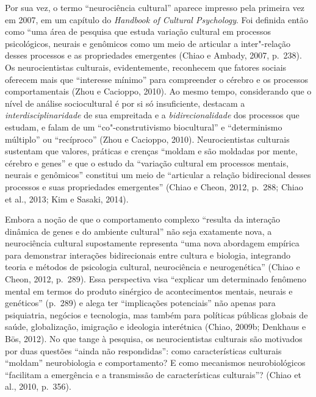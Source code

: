 Por sua vez, o termo ``neurociência cultural'' aparece impresso pela
primeira vez em 2007, em um capítulo do \emph{Handbook of Cultural
Psychology}. Foi definida então como ``uma área de pesquisa que estuda
variação cultural em processos psicológicos, neurais e genômicos como um
meio de articular a inter"-relação desses processos e as propriedades
emergentes (Chiao e Ambady, 2007, p.~238). Os neurocientistas culturais,
evidentemente, reconhecem que fatores sociais oferecem mais que
``interesse mínimo'' para compreender o cérebro e os processos
comportamentais (Zhou e Cacioppo, 2010). Ao mesmo tempo, considerando
que o nível de análise sociocultural é por si só insuficiente, destacam
a \emph{interdisciplinaridade} de sua empreitada e a
\emph{bidirecionalidade} dos processos que estudam, e falam de um
``co"-construtivismo biocultural'' e ``determinismo múltiplo'' ou
``recíproco'' (Zhou e Cacioppo, 2010). Neurocientistas culturais
sustentam que valores, práticas e crenças ``moldam e são moldadas por
mente, cérebro e genes'' e que o estudo da ``variação cultural em
processos mentais, neurais e genômicos'' constitui um meio de
``articular a relação bidirecional desses processos e suas propriedades
emergentes'' (Chiao e Cheon, 2012, p.~288; Chiao et al., 2013; Kim e
Sasaki, 2014).

Embora a noção de que o comportamento complexo ``resulta da interação
dinâmica de genes e do ambiente cultural'' não seja exatamente nova, a
neurociência cultural supostamente representa ``uma nova abordagem
empírica para demonstrar interações bidirecionais entre cultura e
biologia, integrando teoria e métodos de psicologia cultural,
neurociência e neurogenética'' (Chiao e Cheon, 2012, p.~289). Essa
perspectiva visa ``explicar um determinado fenômeno mental em termos do
produto sinérgico de acontecimentos mentais, neurais e genéticos''
(p.~289) e alega ter ``implicações potenciais'' não apenas para
psiquiatria, negócios e tecnologia, mas também para políticas públicas
globais de saúde, globalização, imigração e ideologia interétnica
(Chiao, 2009b; Denkhaus e Bös, 2012). No que tange à pesquisa, os
neurocientistas culturais são motivados por duas questões ``ainda não
respondidas'': como características culturais ``moldam'' neurobiologia e
comportamento? E como mecanismos neurobiológicos ``facilitam a
emergência e a transmissão de características culturais''? (Chiao et
al., 2010, p.~356).

